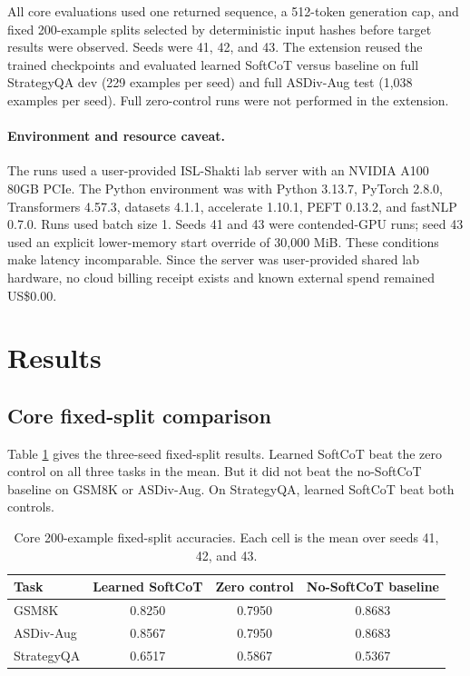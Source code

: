 \documentclass{article}
\begin{document}
All core evaluations used one returned sequence, a 512-token generation cap, and fixed 200-example splits selected by deterministic input hashes before target results were observed. Seeds were 41, 42, and 43. The extension reused the trained checkpoints and evaluated learned SoftCoT versus baseline on full StrategyQA dev (229 examples per seed) and full ASDiv-Aug test (1,038 examples per seed). Full zero-control runs were not performed in the extension.

\paragraph{Environment and resource caveat.}
The runs used a user-provided ISL-Shakti lab server with an NVIDIA A100 80GB PCIe. The Python environment was  with Python 3.13.7, PyTorch 2.8.0, Transformers 4.57.3, datasets 4.1.1, accelerate 1.10.1, PEFT 0.13.2, and fastNLP 0.7.0. Runs used batch size 1. Seeds 41 and 43 were contended-GPU runs; seed 43 used an explicit lower-memory start override of 30,000 MiB. These conditions make latency incomparable. Since the server was user-provided shared lab hardware, no cloud billing receipt exists and known external spend remained US\$0.00.

\section{Results}

\subsection{Core fixed-split comparison}

Table \ref{tab:core} gives the three-seed fixed-split results. Learned SoftCoT beat the zero control on all three tasks in the mean. But it did not beat the no-SoftCoT baseline on GSM8K or ASDiv-Aug. On StrategyQA, learned SoftCoT beat both controls.

\begin{table}[h]
\centering
\caption{Core 200-example fixed-split accuracies. Each cell is the mean over seeds 41, 42, and 43.}
\label{tab:core}
\begin{tabular}{lccc}
\toprule
Task & Learned SoftCoT & Zero control & No-SoftCoT baseline \\
\midrule
GSM8K & 0.8250 & 0.7950 & 0.8683 \\
ASDiv-Aug & 0.8567 & 0.7950 & 0.8683 \\
StrategyQA & 0.6517 & 0.5867 & 0.5367 \\
\bottomrule
\end{tabular}
\end{table}
\end{document}
